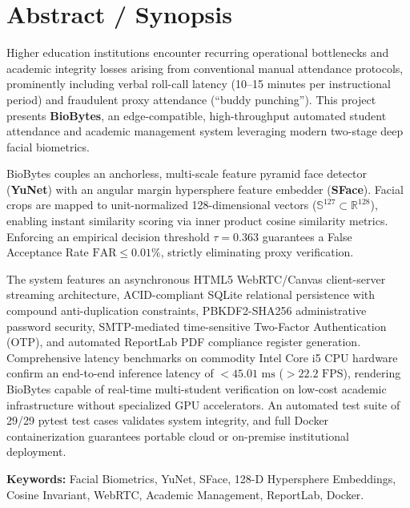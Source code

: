 \documentclass[12pt,a4paper,oneside]{report}
\begin{document}
\clearpage

\chapter*{Abstract / Synopsis}

\noindent Higher education institutions encounter recurring operational bottlenecks and academic integrity losses arising from conventional manual attendance protocols, prominently including verbal roll-call latency (10--15 minutes per instructional period) and fraudulent proxy attendance (``buddy punching''). This project presents \textbf{BioBytes}, an edge-compatible, high-throughput automated student attendance and academic management system leveraging modern two-stage deep facial biometrics.

\vspace{0.5cm}
\noindent BioBytes couples an anchorless, multi-scale feature pyramid face detector (\textbf{YuNet}) with an angular margin hypersphere feature embedder (\textbf{SFace}). Facial crops are mapped to unit-normalized 128-dimensional vectors ($\mathbb{S}^{127} \subset \mathbb{R}^{128}$), enabling instant similarity scoring via inner product cosine similarity metrics. Enforcing an empirical decision threshold $\tau = 0.363$ guarantees a False Acceptance Rate $\text{FAR} \leq 0.01\%$, strictly eliminating proxy verification.

\vspace{0.5cm}
\noindent The system features an asynchronous HTML5 WebRTC/Canvas client-server streaming architecture, ACID-compliant SQLite relational persistence with compound anti-duplication constraints, PBKDF2-SHA256 administrative password security, SMTP-mediated time-sensitive Two-Factor Authentication (OTP), and automated ReportLab PDF compliance register generation. Comprehensive latency benchmarks on commodity Intel Core i5 CPU hardware confirm an end-to-end inference latency of $< 45.01\text{ ms}$ ($> 22.2\text{ FPS}$), rendering BioBytes capable of real-time multi-student verification on low-cost academic infrastructure without specialized GPU accelerators. An automated test suite of 29/29 pytest test cases validates system integrity, and full Docker containerization guarantees portable cloud or on-premise institutional deployment.

\vspace{0.5cm}
\noindent \textbf{Keywords:} Facial Biometrics, YuNet, SFace, 128-D Hypersphere Embeddings, Cosine Invariant, WebRTC, Academic Management, ReportLab, Docker.
\end{document}
